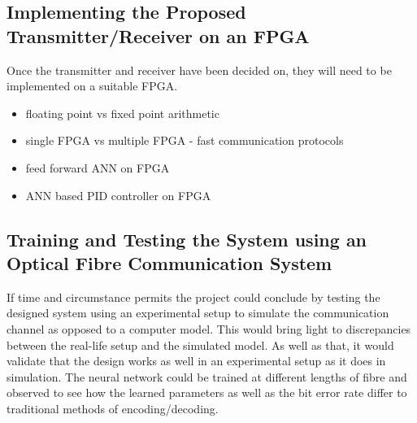 \subsection{Implementing the Proposed Transmitter/Receiver on an FPGA}

Once the transmitter and receiver have been decided on, they will need to be implemented on a suitable FPGA.

\begin{itemize}
	\item floating point vs fixed point arithmetic 
	\item single FPGA vs multiple FPGA - fast communication protocols
	\item feed forward ANN on FPGA \autocite{7011454}
	\item ANN based PID controller on FPGA \autocite{5328349}
\end{itemize}

\subsection{Training and Testing the System using an Optical Fibre Communication System}

If time and circumstance permits the project could conclude by testing the designed system using an experimental setup to simulate the communication channel as opposed to a computer model. This would bring light to discrepancies between the real-life setup and the simulated model. As well as that, it would validate that the design works as well in an experimental setup as it does in simulation. The neural network could be trained at different lengths of fibre and observed to see how the learned parameters as well as the bit error rate differ to traditional methods of encoding/decoding. 

